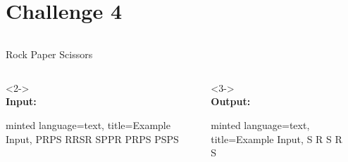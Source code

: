     \section{Challenge 4}\label{sec:challenge-5}
    \begin{frame}[c, fragile]
        \slidehead
        \begin{columns}[c]
            \begin{column}{.5\textwidth}
                \Large
                Rock Paper Scissors
                \vspace{1em}
                \normalsize

                \begin{columns}[c]
                    \begin{column}{.5\textwidth}
                        \begin{onlyenv}<2->
                            \mbox{}
                            \\
                            \textbf{Input:}
                            \begin{codeBlock}{
                                minted language=text,
                                title=Example Input,
                            }
                                PRPS
                                RRSR
                                SPPR
                                PRPS
                                PSPS
                            \end{codeBlock}
                        \end{onlyenv}
                    \end{column}
                    \begin{column}{.5\textwidth}
                        \begin{onlyenv}<3->
                            \mbox{}
                            \\
                            \textbf{Output:}
                            \begin{codeBlock}{
                                minted language=text,
                                title=Example Input,
                            }
                                S
                                R
                                S
                                R
                                S
                            \end{codeBlock}
                        \end{onlyenv}
                    \end{column}
                \end{columns}
            \end{column}
            \begin{column}{.5\textwidth}
                \centering
                
            \end{column}
        \end{columns}
    \end{frame}

